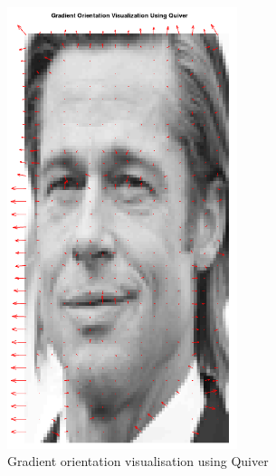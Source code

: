 \documentclass[a4paper]{article}
\begin{document}
\begin{minipage}{0.49\textwidth}
\begin{figure}[H]
    \centering
    \includegraphics[width=0.6\textwidth]{./images/1_gradient_orientation.png}
    \caption{Gradient orientation visualisation using Quiver}
\end{figure}
\end{minipage}
\hfill
\end{document}
